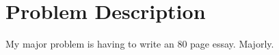 \section{Problem Description}
\label{sec:int_problem}

My major problem is having to write an 80 page essay. Majorly.